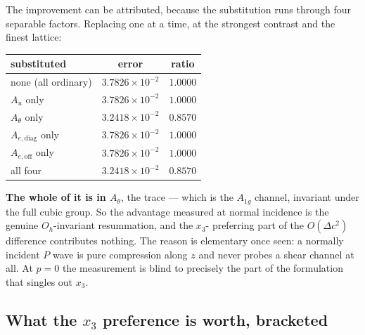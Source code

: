 \documentclass[11pt,a4paper]{article}
\newcommand{\Oh}{O_{h}}
\begin{document}
The improvement can be attributed, because the substitution runs through four
separable factors.  Replacing one at a time, at the strongest contrast and the
finest lattice:
\begin{center}
\begin{tabular}{lcc}
\toprule
substituted & error & ratio\\
\midrule
none (all ordinary)      & $3.7826\times10^{-2}$ & $1.0000$\\
$A_u$ only               & $3.7826\times10^{-2}$ & $1.0000$\\
$A_\theta$ only          & $3.2418\times10^{-2}$ & $\mathbf{0.8570}$\\
$A_{e,\mathrm{diag}}$ only & $3.7826\times10^{-2}$ & $1.0000$\\
$A_{e,\mathrm{off}}$ only  & $3.7826\times10^{-2}$ & $1.0000$\\
all four                 & $3.2418\times10^{-2}$ & $0.8570$\\
\bottomrule
\end{tabular}
\end{center}
\textbf{The whole of it is in $A_\theta$}, the trace --- which is the $A_{1g}$
channel, invariant under the full cubic group.  So the advantage measured at
normal incidence is the genuine $\Oh$-invariant resummation, and the $x_3$-
preferring part of the $O(\Delta c^2)$ difference contributes nothing.  The
reason is elementary once seen: a normally incident $P$ wave is pure compression
along $z$ and never probes a shear channel at all.  At $p=0$ the measurement is
blind to precisely the part of the formulation that singles out $x_3$.

\subsection{What the \texorpdfstring{$x_3$}{x3} preference is worth, bracketed}
\end{document}
